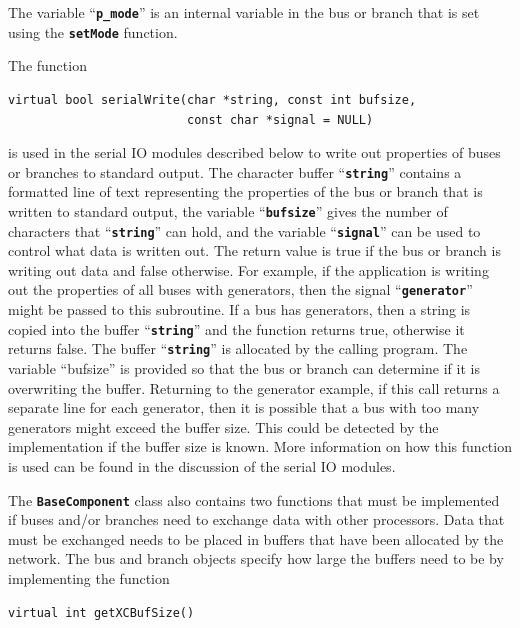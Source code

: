 \documentclass[12pt]{report} %
\begin{document}
The variable ``\texttt{\textbf{p\_mode}}'' is an internal variable in the bus or branch that is set using the \texttt{\textbf{setMode}} function.

The function

{
\color{red}
\begin{Verbatim}[fontseries=b]
virtual bool serialWrite(char *string, const int bufsize,
                         const char *signal = NULL)
\end{Verbatim}
}

is used in the serial IO modules described below to write out properties of buses or branches to standard output. The character buffer ``\texttt{\textbf{string}}'' contains a formatted line of text representing the properties of the bus or branch that is written to standard output, the variable ``\texttt{\textbf{bufsize}}'' gives the number of characters that ``\texttt{\textbf{string}}'' can hold, and the variable ``\texttt{\textbf{signal}}'' can be used to control what data is written out. The return value is true if the bus or branch is writing out data and false otherwise. For example, if the application is writing out the properties of all buses with generators, then the signal ``\texttt{\textbf{generator}}'' might be passed to this subroutine. If a bus has generators, then a string is copied into the buffer ``\texttt{\textbf{string}}'' and the function returns true, otherwise it returns false. The buffer ``\texttt{\textbf{string}}'' is allocated by the calling program. The variable ``bufsize'' is provided so that the bus or branch can determine if it is overwriting the buffer. Returning to the generator example, if this call returns a separate line for each generator, then it is possible that a bus with too many generators might exceed the buffer size. This could be detected by the implementation if the buffer size is known. More information on how this function is used can be found in the discussion of the serial IO modules.

The \texttt{\textbf{BaseComponent}} class also contains two functions that must be implemented if buses and/or branches need to exchange data with other processors. Data that must be exchanged needs to be placed in buffers that have been allocated by the network. The bus and branch objects specify how large the buffers need to be by implementing the function

{
\color{red}
\begin{Verbatim}[fontseries=b]
virtual int getXCBufSize()
\end{Verbatim}
}
\end{document}
